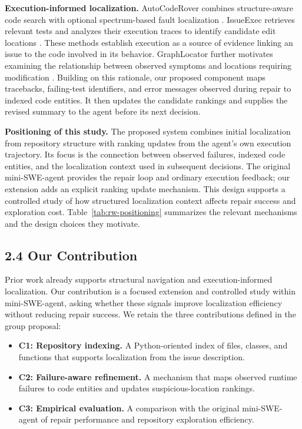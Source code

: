 \documentclass[11pt]{article}
\begin{document}
\textbf{Execution-informed localization.}
AutoCodeRover combines structure-aware code search with optional
spectrum-based fault localization \cite{zhang2024autocoderover}.
IssueExec retrieves relevant tests and analyzes their execution
traces to identify candidate edit locations \cite{liu2026issueexec}.
These methods establish execution as a source of evidence linking
an issue to the code involved in its behavior.
GraphLocator further motivates examining the relationship between
observed symptoms and locations requiring modification
\cite{liu2025graphlocator}.
Building on this rationale, our proposed component maps tracebacks,
failing-test identifiers, and error messages observed during repair
to indexed code entities.
It then updates the candidate rankings and supplies the revised
summary to the agent before its next decision.

\textbf{Positioning of this study.}
The proposed system combines initial localization from repository
structure with ranking updates from the agent's own execution
trajectory.
Its focus is the connection between observed failures, indexed
code entities, and the localization context used in subsequent
decisions.
The original mini-SWE-agent provides the repair loop and ordinary
execution feedback; our extension adds an explicit ranking update
mechanism.
This design supports a controlled study of how structured
localization context affects repair success and exploration cost.
Table~\ref{tab:rw-positioning} summarizes the relevant mechanisms
and the design choices they motivate.


\subsection*{2.4 Our Contribution}

Prior work already supports structural navigation and execution-informed localization. Our contribution is a focused extension and controlled study within mini-SWE-agent, asking whether these signals improve localization efficiency without reducing repair success. We retain the three contributions defined in the group proposal:

\begin{itemize}
    \item \textbf{C1: Repository indexing.} A Python-oriented index of files, classes, and functions that supports localization from the issue description.
    \item \textbf{C2: Failure-aware refinement.} A mechanism that maps observed runtime failures to code entities and updates suspicious-location rankings.
    \item \textbf{C3: Empirical evaluation.} A comparison with the original mini-SWE-agent of repair performance and repository exploration efficiency.
\end{itemize}
\end{document}
